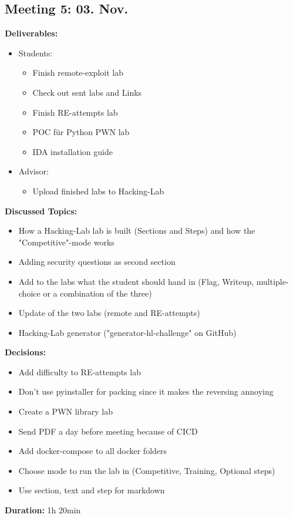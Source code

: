 \subsection*{Meeting 5: 03. Nov.}
\textbf{Deliverables:}
\begin{itemize}
    \item Students:
    \begin{itemize}
        \item Finish remote-exploit lab
        \item Check out sent labs and Links
        \item Finish RE-attempts lab
        \item POC für Python PWN lab
        \item IDA installation guide
    \end{itemize}
    \item Advisor:
    \begin{itemize}
        \item Upload finished labs to Hacking-Lab
    \end{itemize}
\end{itemize} 
\textbf{Discussed Topics:}
\begin{itemize}
    \item How a Hacking-Lab lab is built (Sections and Steps) and how the "Compe\-titive"-mode works
    \item Adding security questions as second section
    \item Add to the labs what the student should hand in (Flag, Writeup, multiple-choice or a combination of the three)
    \item Update of the two labs (remote and RE-attempts)
    \item Hacking-Lab generator ("generator-hl-challenge" on GitHub)
\end{itemize}
\textbf{Decisions:}
\begin{itemize}
    \item Add difficulty to RE-attempts lab
    \item Don't use pyinstaller for packing since it makes the reversing annoying
    \item Create a PWN library lab
    \item Send PDF a day before meeting because of CICD
    \item Add docker-compose to all docker folders
    \item Choose mode to run the lab in (Competitive, Training, Optional steps)
    \item Use section, text and step for markdown
\end{itemize}
\textbf{Duration:} 1h 20min

